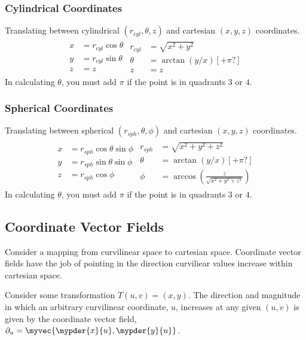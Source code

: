 \documentclass[11pt]{article}
\newenvironment{mybox}
{\begin{tcolorbox}[colback=red!5!white,colframe=red!75!black]}
{\end{tcolorbox}}
\begin{document}
\subsubsection{Cylindrical Coordinates}
\begin{mybox}
    Translating between cylindrical $(r_{cyl},\theta,z)$ and cartesian $(x,y,z)$ coordinates.
    \begin{align*}
        \begin{split}
            x &= r_{cyl}\cos{\theta}\\
            y &= r_{cyl}\sin{\theta}\\
            z &= z
        \end{split}
        \begin{split}
            r_{cyl} &= \sqrt{x^2+y^2} \\
        \theta &= \arctan{\left(y/x\right)} [+\pi?]\\
        z &= z
        \end{split}
    \end{align*}
    In calculating $\theta$, you must add $\pi$ if the point is in quadrants $3$ or $4$.
\end{mybox}
\subsubsection{Spherical Coordinates}
\begin{mybox}
Translating between spherical $(r_{sph},\theta,\phi)$ and cartesian $(x,y,z)$ coordinates.
    \begin{align*}
        \begin{split}
            x &= r_{sph}\cos{\theta}\sin{\phi}\\
            y &= r_{sph}\sin{\theta}\sin{\phi}\\
            z &= r_{sph}\cos{\phi}
        \end{split}
        \begin{split}
            r_{sph} &= \sqrt{x^2+y^2+z^2}\\
            \theta  &= \arctan{\left(y/x\right)} [+\pi?]\\
            \phi    &= \arccos{\left(\frac{z}{\sqrt{x^2+y^2+z^2}}\right)}
        \end{split}
    \end{align*}
    In calculating $\theta$, you must add $\pi$ if the point is in quadrants $3$ or $4$.
\end{mybox}

\subsection{Coordinate Vector Fields}
Consider a mapping from curvilinear space to cartesian space. Coordinate vector fields have the job of pointing in the direction curviliear values increase within cartesian space.
\begin{mybox}
    Consider some transformation $T(u,v)=(x,y)$. The direction and magnitude in which an arbitrary curvilinear coordinate, $u$, increases at any given $(u,v)$ is given by the coordinate vector field, $\partial_u = \myvec{\mypder{x}{u},\mypder{y}{u}}$.
\end{mybox}
\end{document}
